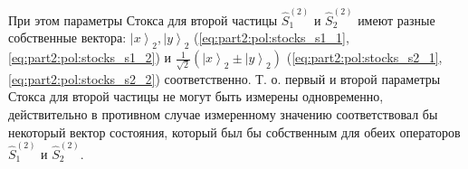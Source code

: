 При этом параметры Стокса для второй частицы  $\hat{S}_1^{(2)}$ и
$\hat{S}_2^{(2)}$ имеют 
разные собственные вектора:
$\left|x\right>_2, \left|y\right>_2$ (\ref{eq:part2:pol:stocks_s1_1},
  \ref{eq:part2:pol:stocks_s1_2}) и
$\frac{1}{\sqrt{2}}\left(\left|x\right>_2 \pm
\left|y\right>_2\right)$ (\ref{eq:part2:pol:stocks_s2_1},
  \ref{eq:part2:pol:stocks_s2_2}) соответственно.
Т. о. первый и второй параметры Стокса для второй частицы не могут
быть измерены одновременно, действительно в противном случае
измеренному значению соответствовал бы  
некоторый вектор состояния, который был бы собственным для обеих
операторов $\hat{S}_1^{(2)}$ и
$\hat{S}_2^{(2)}$.





